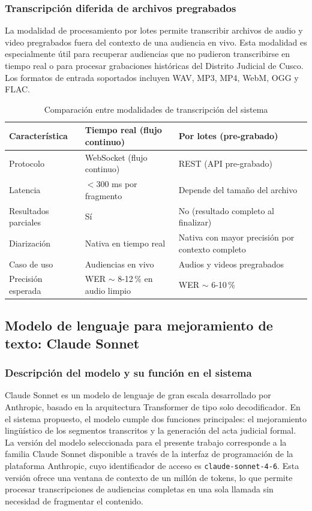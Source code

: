 \documentclass[12pt,a4paper,oneside]{article}
\begin{document}
\subsubsection{Transcripci\'on diferida de archivos pregrabados}

La modalidad de procesamiento por lotes permite transcribir archivos de audio y video pregrabados fuera del contexto de una audiencia en vivo. Esta modalidad es especialmente \'util para recuperar audiencias que no pudieron transcribirse en tiempo real o para procesar grabaciones hist\'oricas del Distrito Judicial de Cusco. Los formatos de entrada soportados incluyen WAV, MP3, MP4, WebM, OGG y FLAC.

\begin{table}[H]
\centering
\caption{Comparaci\'on entre modalidades de transcripci\'on del sistema}
\begin{tabular}{|p{3.5cm}|p{4.5cm}|p{4.5cm}|}
\hline
\rowcolor{gray!20}
\textbf{Caracter\'istica} & \textbf{Tiempo real (flujo continuo)} & \textbf{Por lotes (pre-grabado)} \\
\hline
Protocolo & WebSocket (flujo continuo) & REST (API pre-grabado) \\
\hline
Latencia & $< 300$ ms por fragmento & Depende del tama\~no del archivo \\
\hline
Resultados parciales & S\'i & No (resultado completo al finalizar) \\
\hline
Diarizaci\'on & Nativa en tiempo real & Nativa con mayor precisi\'on por contexto completo \\
\hline
Caso de uso & Audiencias en vivo & Audios y videos pregrabados \\
\hline
Precisi\'on esperada & WER $\sim$ 8-12\,\% en audio limpio & WER $\sim$ 6-10\,\% \\
\hline
\end{tabular}
\label{tab:comparacion_modalidades}
\end{table}

\subsection{Modelo de lenguaje para mejoramiento de texto: Claude Sonnet}

\subsubsection{Descripci\'on del modelo y su funci\'on en el sistema}

Claude Sonnet es un modelo de lenguaje de gran escala desarrollado por Anthropic, basado en la arquitectura Transformer de tipo solo decodificador. En el sistema propuesto, el modelo cumple dos funciones principales: el mejoramiento ling\"u\'istico de los segmentos transcritos y la generaci\'on del acta judicial formal. La versi\'on del modelo seleccionada para el presente trabajo corresponde a la familia Claude Sonnet disponible a trav\'es de la interfaz de programaci\'on de la plataforma Anthropic, cuyo identificador de acceso es \texttt{claude-sonnet-4-6}. Esta versi\'on ofrece una ventana de contexto de un mill\'on de tokens, lo que permite procesar transcripciones de audiencias completas en una sola llamada sin necesidad de fragmentar el contenido.
\end{document}
